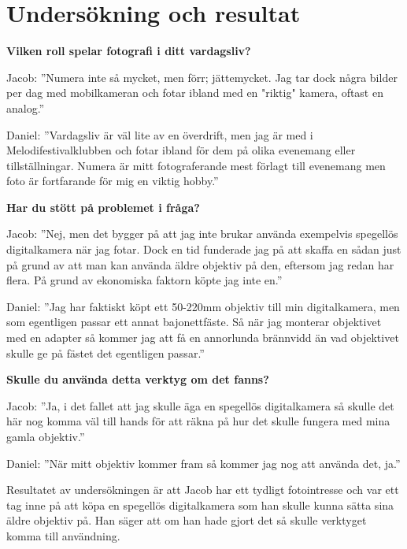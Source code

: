 \documentclass[11pt]{article}
\begin{document}
\clearpage

\section{Undersökning och resultat}
\textbf{Vilken roll spelar fotografi i ditt vardagsliv?}\par

Jacob: ”Numera inte så mycket, men förr; jättemycket. Jag tar dock några bilder
per dag med mobilkameran och fotar ibland med en "riktig" kamera, oftast en
analog.”\par

Daniel: ”Vardagsliv är väl lite av en överdrift, men jag är med i
Melodifestivalklubben och fotar ibland för dem på olika evenemang eller
tillställningar. Numera är mitt fotograferande mest förlagt till evenemang men
foto är fortfarande för mig en viktig hobby.”\par

\textbf{Har du stött på problemet i fråga?}\par

Jacob: ”Nej, men det bygger på att jag inte brukar använda exempelvis spegellös
digitalkamera när jag fotar. Dock en tid funderade jag på att skaffa en sådan
just på grund av att man kan använda äldre objektiv på den, eftersom jag redan
har flera. På grund av ekonomiska faktorn köpte jag inte en.”\par

\sloppy
Daniel: ”Jag har faktiskt köpt ett 50-220mm objektiv till min digitalkamera, men
som egentligen passar ett annat bajonettfäste. Så när jag monterar objektivet
med en adapter så kommer jag att få en annorlunda brännvidd än vad objektivet
skulle ge på fästet det egentligen passar.”\par
\fussy

\textbf{Skulle du använda detta verktyg om det fanns?}\par

Jacob: ”Ja, i det fallet att jag skulle äga en spegellös digitalkamera så
skulle det här nog komma väl till hands för att räkna på hur det skulle fungera
med mina gamla objektiv.”\par

Daniel: ”När mitt objektiv kommer fram så kommer jag nog att använda det, ja.”
\par

\bigskip
\sloppy
Resultatet av undersökningen är att Jacob har ett tydligt fotointresse och var
ett tag inne på att köpa en spegellös digitalkamera som han skulle kunna sätta
sina äldre objektiv på. Han säger att om han hade gjort det så skulle verktyget
komma till användning.\par
\end{document}
